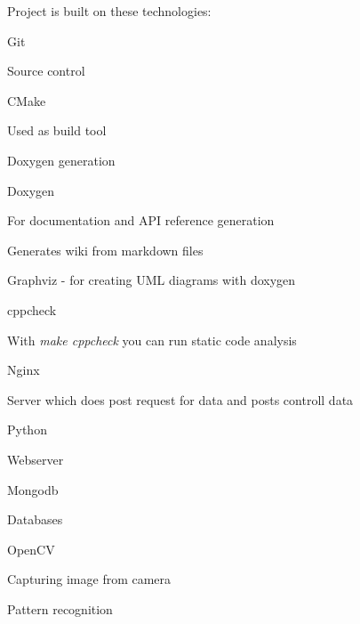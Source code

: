 Project is built on these technologies\+:


\begin{DoxyItemize}
\item Git
\begin{DoxyItemize}
\item Source control
\end{DoxyItemize}
\item C\+Make
\begin{DoxyItemize}
\item Used as build tool
\item Doxygen generation
\end{DoxyItemize}
\item Doxygen
\begin{DoxyItemize}
\item For documentation and A\+PI reference generation
\item Generates wiki from markdown files
\item Graphviz -\/ for creating U\+ML diagrams with doxygen
\end{DoxyItemize}
\item cppcheck
\begin{DoxyItemize}
\item With {\itshape make cppcheck} you can run static code analysis
\end{DoxyItemize}
\item Nginx
\begin{DoxyItemize}
\item Server which does post request for data and posts controll data
\end{DoxyItemize}
\item Python
\begin{DoxyItemize}
\item Webserver
\end{DoxyItemize}
\item Mongodb
\begin{DoxyItemize}
\item Databases
\end{DoxyItemize}
\item Open\+CV
\begin{DoxyItemize}
\item Capturing image from camera
\item Pattern recognition 
\end{DoxyItemize}
\end{DoxyItemize}